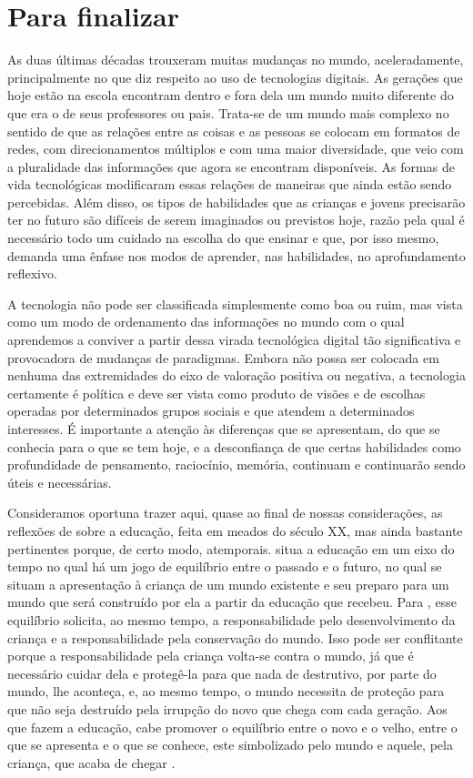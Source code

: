 \section{Para finalizar}\label{sec-parafinalizar}

As duas últimas décadas trouxeram muitas mudanças no mundo, aceleradamente, principalmente no que diz respeito ao uso de tecnologias digitais. As gerações que hoje estão na escola encontram dentro e fora dela um mundo muito diferente do que era o de seus professores ou pais. Trata-se de um mundo mais complexo no sentido de que as relações entre as coisas e as pessoas se colocam em formatos de redes, com direcionamentos múltiplos e com uma maior diversidade, que veio com a pluralidade das informações que agora se encontram disponíveis. As formas de vida tecnológicas \cite{lash2012} modificaram essas relações de maneiras que ainda estão sendo percebidas. Além disso, os tipos de habilidades que as crianças e jovens precisarão ter no futuro são difíceis de serem imaginados ou previstos hoje, razão pela qual é necessário todo um cuidado na escolha do que ensinar e que, por isso mesmo, demanda uma ênfase nos modos de aprender, nas habilidades, no aprofundamento reflexivo. 

A tecnologia não pode ser classificada simplesmente como boa ou ruim, mas vista como um modo de ordenamento das informações no mundo com o qual aprendemos a conviver a partir dessa virada tecnológica digital tão significativa e provocadora de mudanças de paradigmas. Embora não possa ser colocada em nenhuma das extremidades do eixo de valoração positiva ou negativa, a tecnologia certamente é política e deve ser vista como produto de visões e de escolhas operadas por determinados grupos sociais e que atendem a determinados interesses. É importante a atenção às diferenças que se apresentam, do que se conhecia para o que se tem hoje, e a desconfiança de que certas habilidades como profundidade de pensamento, raciocínio, memória, continuam e continuarão sendo úteis e necessárias.

Consideramos oportuna trazer aqui, quase ao final de nossas considerações, as reflexões de \textcite{arendt2014} sobre a educação, feita em meados do século XX, mas ainda bastante pertinentes porque, de certo modo, atemporais. \textcite{arendt2014} situa a educação em um eixo do tempo no qual há um jogo de equilíbrio entre o passado e o futuro, no qual se situam a apresentação à criança de um mundo existente e seu preparo para um mundo que será construído por ela a partir da educação que recebeu. Para \textcite{arendt2014}, esse equilíbrio solicita, ao mesmo tempo, a responsabilidade pelo desenvolvimento da criança e a responsabilidade pela conservação do mundo. Isso pode ser conflitante porque a responsabilidade pela criança volta-se contra o mundo, já que é necessário cuidar dela e protegê-la para que nada de destrutivo, por parte do mundo, lhe aconteça, e, ao mesmo tempo, o mundo necessita de proteção para que não seja destruído pela irrupção do novo que chega com cada geração. Aos que fazem a educação, cabe promover o equilíbrio entre o novo e o velho, entre o que se apresenta e o que se conhece, este simbolizado pelo mundo e aquele, pela criança, que acaba de chegar \cite{noronha2020}. 

